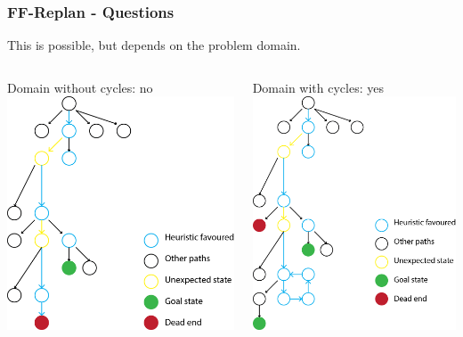 \documentclass{beamer}
\let\origframetitle=\frametitle
\renewcommand\frametitle[1]{\origframetitle{\textbf{\large{\textrm{#1}}}}}
\begin{document}
\begin{frame}
  \frametitle{FF-Replan - Questions}

This is possible, but depends on the problem domain. 
\vspace{1cm}
\begin{columns}
 Domain without cycles: no
\includegraphics[scale=0.4]{images/Question1a.png}

 Domain with cycles: yes
\includegraphics[scale=0.4]{images/Question1b.png}
\end{columns}
\end{frame}
\end{document}
